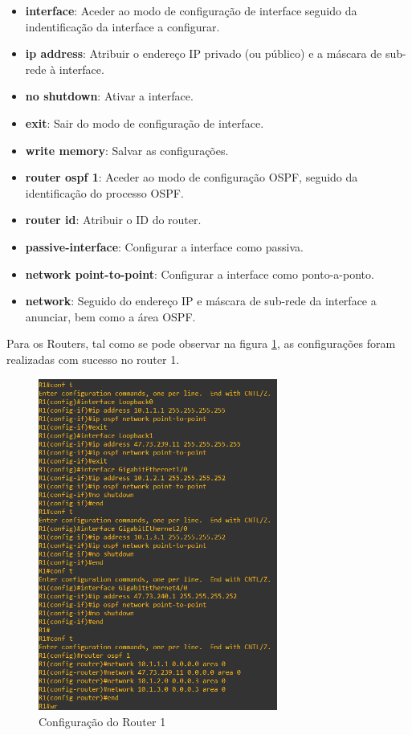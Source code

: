\documentclass[11pt,english, openright, oneside]{book}
\begin{document}
\begin{itemize}
  \item \textbf{interface}: Aceder ao modo de configuração de interface seguido da indentificação da interface a configurar.
  \item \textbf{ip address}: Atribuir o endereço IP privado (ou público) e a máscara de sub-rede à interface.
  \item \textbf{no shutdown}: Ativar a interface.
  \item \textbf{exit}: Sair do modo de configuração de interface.
  \item \textbf{write memory}: Salvar as configurações. 
  \item \textbf{router ospf 1}: Aceder ao modo de configuração OSPF, seguido da identificação do processo OSPF.
  \item \textbf{router id}: Atribuir o ID do router.
  \item \textbf{passive-interface}: Configurar a interface como passiva.
  \item \textbf{network point-to-point}: Configurar a interface como ponto-a-ponto.
  \item \textbf{network}: Seguido do endereço IP e máscara de sub-rede da interface a anunciar, bem como a área OSPF.
\end{itemize}
\vspace{0.2cm}

\newpage
Para os Routers, tal como se pode observar na figura \ref{fig:config1}, as configurações foram realizadas com sucesso no router 1.
\vspace{0.2cm}

\begin{figure}[H]
  \centering
  \includegraphics[width=0.70\textwidth]{imagens/Tarefa1/1.configR1.png}
  \caption{Configuração do Router 1}
  \label{fig:config1}
\end{figure}
\vspace{0.2cm}
\end{document}
